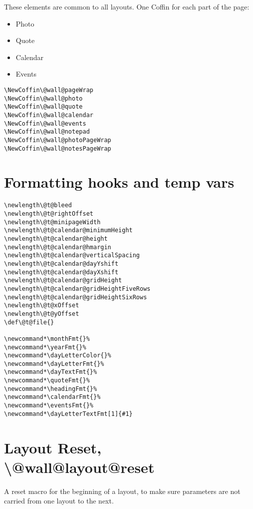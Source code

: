 \documentclass[11pt,oneside]{memoir-article}
\begin{document}
These elements are common to all layouts. One Coffin for each part of the
page:

\begin{itemize}
\item Photo
\item Quote
\item Calendar
\item Events
\end{itemize}

\begin{verbatim}
\NewCoffin\@wall@pageWrap
\NewCoffin\@wall@photo
\NewCoffin\@wall@quote
\NewCoffin\@wall@calendar
\NewCoffin\@wall@events
\NewCoffin\@wall@notepad
\NewCoffin\@wall@photoPageWrap
\NewCoffin\@wall@notesPageWrap
\end{verbatim}

\section{Formatting hooks and temp vars}
\label{sec:orgfcb649d}

\begin{verbatim}
\newlength\@t@bleed
\newlength\@t@rightOffset
\newlength\@t@minipageWidth
\newlength\@t@calendar@minimumHeight
\newlength\@t@calendar@height
\newlength\@t@calendar@hmargin
\newlength\@t@calendar@verticalSpacing
\newlength\@t@calendar@dayYshift
\newlength\@t@calendar@dayXshift
\newlength\@t@calendar@gridHeight
\newlength\@t@calendar@gridHeightFiveRows
\newlength\@t@calendar@gridHeightSixRows
\newlength\@t@xOffset
\newlength\@t@yOffset
\def\@t@file{}

\newcommand*\monthFmt{}%
\newcommand*\yearFmt{}%
\newcommand*\dayLetterColor{}%
\newcommand*\dayLetterFmt{}%
\newcommand*\dayTextFmt{}%
\newcommand*\quoteFmt{}%
\newcommand*\headingFmt{}%
\newcommand*\calendarFmt{}%
\newcommand*\eventsFmt{}%
\newcommand*\dayLetterTextFmt[1]{#1}
\end{verbatim}

\section{Layout Reset, \textbackslash @wall@layout@reset}
\label{sec:org4178b0e}

A reset macro for the beginning of a layout, to make sure parameters are not
carried from one layout to the next.
\end{document}
